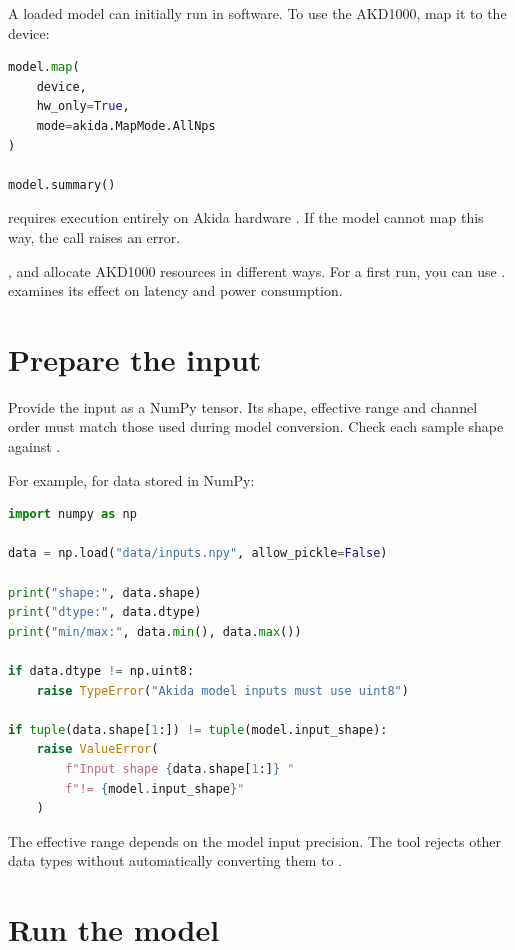 A loaded model can initially run in software. To use the AKD1000, map it to the device:

\begin{lstlisting}[language=Python]
model.map(
    device,
    hw_only=True,
    mode=akida.MapMode.AllNps
)

model.summary()
\end{lstlisting}

 requires execution entirely on Akida hardware
\cite{brainchip_akida_guide}. If the model cannot map this way, the call raises an error.

,  and  allocate AKD1000 resources in different
ways. For a first run, you can use .  examines
its effect on latency and power consumption.

\section{Prepare the input}

Provide the input as a NumPy  tensor. Its shape, effective range and
channel order must match those used during model conversion. Check each sample
shape against .

For example, for data stored in NumPy:

\begin{lstlisting}[language=Python]
import numpy as np

data = np.load("data/inputs.npy", allow_pickle=False)

print("shape:", data.shape)
print("dtype:", data.dtype)
print("min/max:", data.min(), data.max())

if data.dtype != np.uint8:
    raise TypeError("Akida model inputs must use uint8")

if tuple(data.shape[1:]) != tuple(model.input_shape):
    raise ValueError(
        f"Input shape {data.shape[1:]} "
        f"!= {model.input_shape}"
    )
\end{lstlisting}

The effective range depends on the model input precision. The tool rejects other
data types without automatically converting them to .


\section{Run the model}

